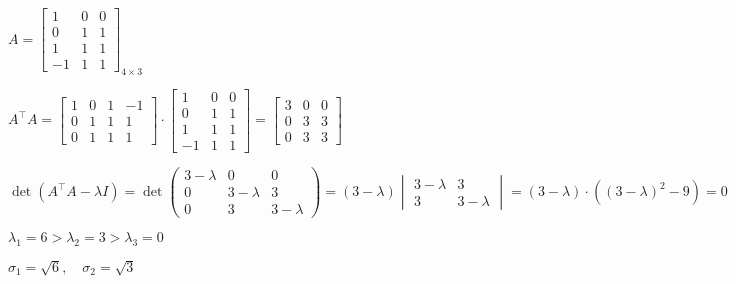 \Ej

$A=\begin{bmatrix}
	1 & 0 & 0 \\
	0 & 1 & 1 \\
	1 & 1 & 1 \\
	-1 & 1 & 1
\end{bmatrix}_{4\times3}$

$A^\intercal A=\begin{bmatrix}
	1 & 0 & 1 & -1 \\
	0 & 1 & 1 & 1 \\
	0 & 1 & 1 & 1
\end{bmatrix}\cdot\begin{bmatrix}
	1 & 0 & 0 \\
	0 & 1 & 1 \\
	1 & 1 & 1 \\
	-1 & 1 & 1
\end{bmatrix}=\begin{bmatrix}
	3 & 0 & 0 \\
	0 & 3 & 3 \\
	0 & 3 & 3
\end{bmatrix}$


$\det(A^\intercal A-\lambda I)=\det\begin{pmatrix}
	3-\lambda & 0& 0\\
	0 & 3-\lambda & 3\\
	0 & 3 & 3-\lambda
\end{pmatrix}=(3-\lambda)\begin{vmatrix}
	3-\lambda & 3 \\
	3 & 3-\lambda
\end{vmatrix}=(3-\lambda)\cdot\left((3-\lambda)^2-9\right)=0$

$\lambda_1=6>\lambda_2=3>\lambda_3=0$

 $\sigma_1=\sqrt{6},\quad\sigma_2=\sqrt{3}$

